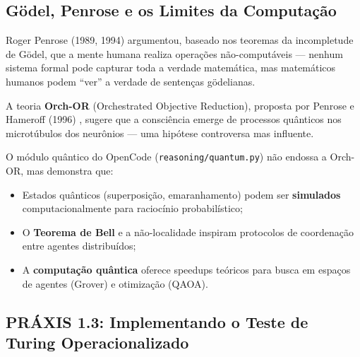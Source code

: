 \subsection{Gödel, Penrose e os Limites da Computação}

Roger Penrose (1989, 1994) \cite{penrose1989emperor, penrose1994shadows} argumentou, baseado nos teoremas da incompletude de Gödel, que a mente humana realiza operações não-computáveis --- nenhum sistema formal pode capturar toda a verdade matemática, mas matemáticos humanos podem ``ver'' a verdade de sentenças gödelianas.

A teoria \textbf{Orch-OR} (Orchestrated Objective Reduction), proposta por Penrose e Hameroff (1996) \cite{hameroff1996orchestrated}, sugere que a consciência emerge de processos quânticos nos microtúbulos dos neurônios --- uma hipótese controversa mas influente.

O módulo quântico do OpenCode (\texttt{reasoning/quantum.py}) não endossa a Orch-OR, mas demonstra que:
\begin{itemize}
    \item Estados quânticos (superposição, emaranhamento) podem ser \textbf{simulados} computacionalmente para raciocínio probabilístico;
    \item O \textbf{Teorema de Bell} e a não-localidade inspiram protocolos de coordenação entre agentes distribuídos;
    \item A \textbf{computação quântica} oferece speedups teóricos para busca em espaços de agentes (Grover) e otimização (QAOA).
\end{itemize}

\subsection{PRÁXIS 1.3: Implementando o Teste de Turing Operacionalizado}

